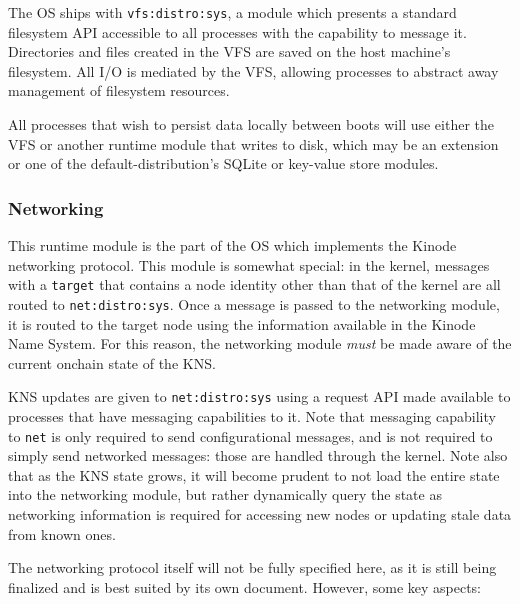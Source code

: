 \documentclass[runningheads]{llncs}
\begin{document}
The OS ships with \verb|vfs:distro:sys|, a module which presents a standard filesystem API accessible to all processes with the capability to message it.
Directories and files created in the VFS are saved on the host machine's filesystem.
All I/O is mediated by the VFS, allowing processes to abstract away management of filesystem resources.

All processes that wish to persist data locally between boots will use either the VFS or another runtime module that writes to disk, which may be an extension or one of the default-distribution's SQLite or key-value store modules.

\subsubsection{Networking}
\label{sec:osnetworking}

This runtime module is the part of the OS which implements the Kinode networking protocol.
This module is somewhat special: in the kernel, messages with a \verb|target| that contains a node identity other than that of the kernel are all routed to \verb|net:distro:sys|.
Once a message is passed to the networking module, it is routed to the target node using the information available in the Kinode Name System.
For this reason, the networking module \textit{must} be made aware of the current onchain state of the KNS.

KNS updates are given to \verb|net:distro:sys| using a request API made available to processes that have messaging capabilities to it.
Note that messaging capability to \verb|net| is only required to send configurational messages, and is not required to simply send networked messages: those are handled through the kernel.
Note also that as the KNS state grows, it will become prudent to not load the entire state into the networking module, but rather dynamically query the state as networking information is required for accessing new nodes or updating stale data from known ones.

The networking protocol itself will not be fully specified here, as it is still being finalized and is best suited by its own document. However, some key aspects:
\end{document}
